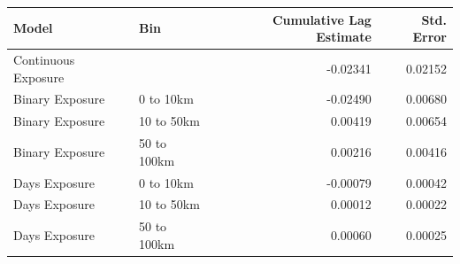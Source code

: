 \begin{table}[ht]
\centering
\begin{tabular}{llrr}
  \toprule
Model & Bin & Cumulative Lag Estimate & Std. Error \\ 
  \midrule
Continuous Exposure &  & -0.02341 & 0.02152 \\ 
  Binary Exposure & 0 to 10km & -0.02490 & 0.00680 \\ 
  Binary Exposure & 10 to 50km & 0.00419 & 0.00654 \\ 
  Binary Exposure & 50 to 100km & 0.00216 & 0.00416 \\ 
  Days Exposure & 0 to 10km & -0.00079 & 0.00042 \\ 
  Days Exposure & 10 to 50km & 0.00012 & 0.00022 \\ 
  Days Exposure & 50 to 100km & 0.00060 & 0.00025 \\ 
   \bottomrule
\end{tabular}
\end{table}

